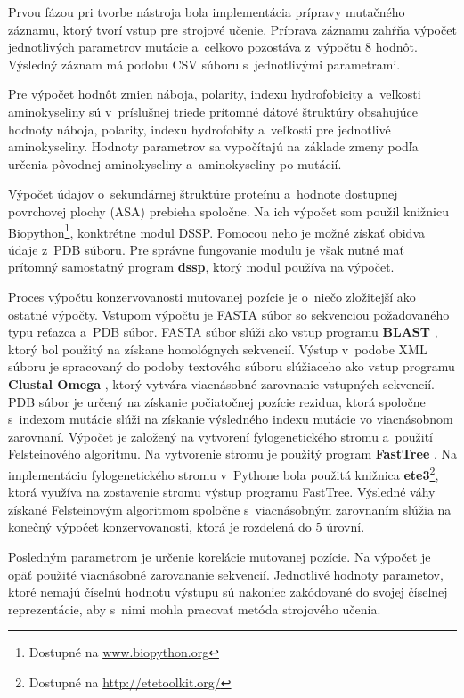 Prvou fázou pri tvorbe nástroja bola implementácia prípravy mutačného záznamu, ktorý tvorí vstup pre strojové učenie. Príprava záznamu zahŕňa výpočet jednotlivých parametrov mutácie a~celkovo pozostáva z~výpočtu 8 hodnôt. Výsledný záznam má podobu CSV súboru s~jednotlivými parametrami.

Pre výpočet hodnôt zmien náboja, polarity, indexu hydrofobicity a~veľkosti aminokyseliny sú v~príslušnej triede prítomné dátové štruktúry obsahujúce hodnoty náboja, polarity, indexu hydrofobity a~veľkosti pre jednotlivé aminokyseliny. Hodnoty parametrov sa vypočítajú na základe zmeny podľa určenia pôvodnej aminokyseliny a~aminokyseliny po mutácií.

Výpočet údajov o~sekundárnej štruktúre proteínu a~hodnote dostupnej povrchovej plochy (ASA) prebieha spoločne. Na ich výpočet som použil knižnicu Biopython\footnote{Dostupné na \url{www.biopython.org}}, konktrétne modul DSSP. Pomocou neho je možné získať obidva údaje z~PDB súboru. Pre správne fungovanie modulu je však nutné mať prítomný samostatný program \textbf{dssp}, ktorý modul používa na výpočet.

Proces výpočtu konzervovanosti mutovanej pozície je o~niečo zložitejší ako ostatné výpočty. Vstupom výpočtu je FASTA súbor so sekvenciou požadovaného typu reťazca a~PDB súbor. FASTA súbor slúži ako vstup programu \textbf{BLAST} \cite{blastp}, ktorý bol použitý na získane homológnych sekvencií. Výstup v~podobe XML súboru je spracovaný do podoby textového súboru slúžiaceho ako vstup programu \textbf{Clustal Omega} \cite{clustal}, ktorý vytvára viacnásobné zarovnanie vstupných sekvencií.
PDB súbor je určený na získanie počiatočnej pozície rezidua, ktorá spoločne s~indexom mutácie slúži na získanie výsledného indexu mutácie vo viacnásobnom zarovnaní. Výpočet je založený na vytvorení fylogenetického stromu a~použití Felsteinového algoritmu. Na vytvorenie stromu je použitý program \textbf{FastTree} \cite{fasttree}. Na implementáciu fylogenetického stromu v~Pythone bola použitá knižnica \textbf{ete3}\footnote{Dostupné na \url{http://etetoolkit.org/}}, ktorá využíva na zostavenie stromu výstup programu FastTree. Výsledné váhy získané Felsteinovým algoritmom spoločne s~viacnásobným zarovnaním slúžia na konečný výpočet konzervovanosti, ktorá je rozdelená do 5 úrovní.

Posledným parametrom je určenie korelácie mutovanej pozície. Na výpočet je opäť použité viacnásobné zarovananie sekvencií. Jednotlivé hodnoty parametov, ktoré nemajú číselnú hodnotu výstupu sú nakoniec zakódované do svojej číselnej reprezentácie, aby s~nimi mohla pracovať metóda strojového učenia.

